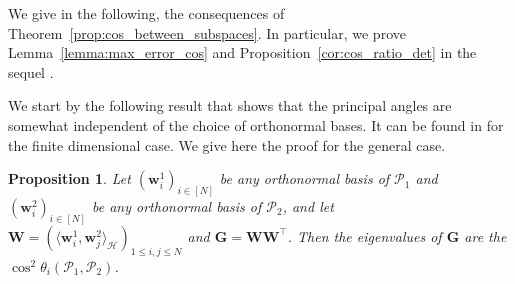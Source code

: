 \documentclass[twoside,11pt]{book}
\newtheorem{proposition}{Proposition}
\numberwithin{theorem}{chapter}
\numberwithin{definition}{chapter}
\numberwithin{proposition}{chapter}
\numberwithin{corollary}{chapter}
\numberwithin{example}{chapter}
\numberwithin{lemma}{chapter}
\numberwithin{assumption}{chapter}
\numberwithin{equation}{chapter}
\numberwithin{figure}{chapter}
\DeclareMathOperator{\Det}{Det}
\DeclareMathOperator{\Tran}{\intercal}
\begin{document}
We give in the following, the consequences of Theorem~\ref{prop:cos_between_subspaces}. In particular, we prove Lemma~\ref{lemma:max_error_cos} and Proposition~\ref{cor:cos_ratio_det} in the sequel
.

We start by the following result that shows that the principal angles are somewhat independent of the choice of orthonormal bases. It can be found in \cite{BjGo73,MiBe92} for the finite dimensional case. We give here the proof for the general case.
\begin{proposition}\label{prop:cos_det_relationship}
Let $(\bm{w}^{1}_{i})_{i \in [N]}$ be any orthonormal basis of $\mathcal{P}_{1}$ and $(\bm{w}^{2}_{i})_{i \in [N]}$ be any orthonormal basis of $\mathcal{P}_{2}$, and let $\bm{W} = (\langle \bm{w}^{1}_{i},\bm{w}^{2}_{j} \rangle_{\mathcal{H}})_{1\leq i,j \leq N}$ and $\bm{G} = \bm{W}\bm{W}^{\Tran}$. Then
the eigenvalues of $\bm{G}$ are the $\cos^{2} \theta_{i}(\mathcal{P}_{1},\mathcal{P}_{2})$. 
\end{proposition}
\end{document}
